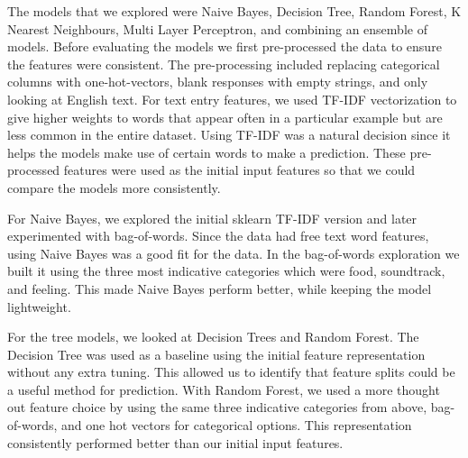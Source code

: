 \documentclass[12pt]{article}
\begin{document}

The models that we explored were Naive Bayes, Decision Tree, Random Forest, K Nearest Neighbours, Multi Layer Perceptron, and combining an ensemble of models. Before evaluating the models we first pre-processed the data to ensure the features were consistent. The pre-processing included replacing categorical columns with one-hot-vectors, blank responses with empty strings, and only looking at English text. For text entry features, we used TF-IDF vectorization to give higher weights to words that appear often in a particular example but are less common in the entire dataset. Using TF-IDF was a natural decision since it helps the models make use of certain words to make a prediction. These pre-processed features were used as the initial input features so that we could compare the models more consistently.

For Naive Bayes, we explored the initial sklearn TF-IDF version and later experimented with bag-of-words. Since the data had free text word features, using Naive Bayes was a good fit for the data. In the bag-of-words exploration we built it using the three most indicative categories which were food, soundtrack, and feeling. This made Naive Bayes perform better, while keeping the model lightweight.

For the tree models, we looked at Decision Trees and Random Forest. The Decision Tree was used as a baseline using the initial feature representation without any extra tuning. This allowed us to identify that feature splits could be a useful method for prediction. With Random Forest, we used a more thought out feature choice by using the same three indicative categories from above, bag-of-words, and one hot vectors for categorical options. This representation consistently performed better than our initial input features.
\end{document}

